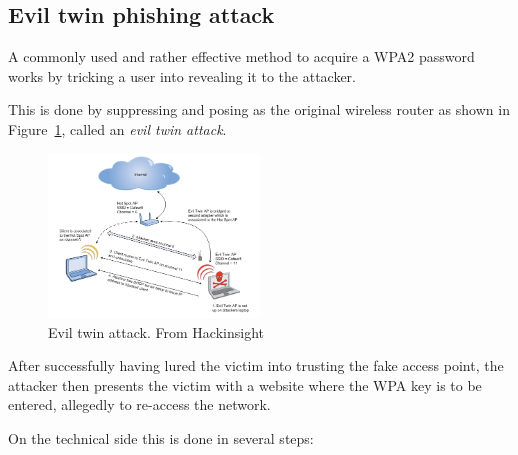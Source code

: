 \subsection{Evil twin phishing attack}\label{sec:eviltwin}

A commonly used and rather effective method to acquire a WPA2 password works by tricking a user into revealing it to the attacker.

This is done by suppressing and posing as the original wireless router as shown in Figure~\ref{fig:eviltwin}, called an \emph{evil twin attack}.

\begin{figure}
\includegraphics[width=0.5\textwidth]{src/img/38_1.jpg}
\caption{Evil twin attack. From Hackinsight~\cite{Hackinsight14}}\label{fig:eviltwin}
\end{figure}

After successfully having lured the victim into trusting the fake access point, the attacker then presents the victim with a website where the WPA key is to be entered, allegedly to re-access the network.

On the technical side this is done in several steps:

